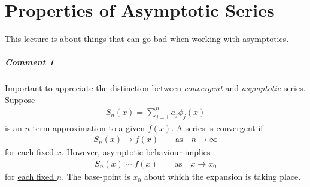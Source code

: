 \chapter{Properties of Asymptotic Series}

This lecture is about things that can go bad when working with asymptotics.

\paragraph{Comment 1}
Important to appreciate the distinction between \emph{convergent} and \emph{asymptotic} series. Suppose
\begin{gather*}
	S_n(x) = \sum_{j=1}^{n} a_j \phi_j(x)
\end{gather*}
is an $n$-term approximation to a given $f(x)$. A series is convergent if 
\begin{align*}
	S_n(x) \rightarrow f(x) \qquad \text{as} \quad n \rightarrow \infty
\end{align*}
for \underline{each fixed $x$}. However, asymptotic behaviour implies
\begin{gather*}
	S_n(x) \sim f(x) \qquad \text{as} \quad x \rightarrow x_0
\end{gather*}
for \underline{each fixed $n$}. The base-point is $x_0$ about which the expansion is taking place. 

